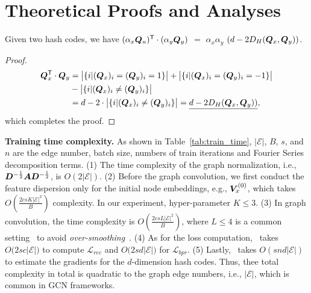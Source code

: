 \section{Theoretical Proofs and Analyses}
\label{sec:discuss}
\addtocounter{thm}{-2}





\begin{thm}
Given two hash codes, we have $(\alpha_x\boldsymbol{Q}_u)^\mathsf{T} \cdot (\alpha_y\boldsymbol{Q}_y)$ $=$ $\alpha_x\alpha_y$ $(d - 2D_{H}(\boldsymbol{Q}_x, \boldsymbol{Q}_y))$.
\end{thm} 

\begin{proof}
\begin{equation}
\begin{aligned}
\setlength\abovedisplayskip{2pt}
\setlength\belowdisplayskip{2pt}
\emb{Q}_x^\mathsf{T} \cdot \emb{Q}_y &= \big|\{ i|(\emb{Q}_{x})_i = (\emb{Q}_{y})_i = 1\}\big| +  \big|\{ i|(\emb{Q}_{x})_i = (\emb{Q}_{y})_i = -1\}\big| \\ 
& -  \big|\{ i|(\emb{Q}_{x})_i \neq (\emb{Q}_{y})_i\}\big|\\
& = d - 2 \cdot \big|\{ i|(\emb{Q}_{x})_i \neq (\emb{Q}_{y})_i\}\big|  = \underline{d - 2D_{H}(\emb{Q}_x, \emb{Q}_y))},\\
\end{aligned}
\end{equation}%
which completes the proof.
\end{proof}


\textbf{Training time complexity.}
As shown in Table~\ref{tab:train_time}, $|\mathcal{E}|$, $B$, $s$, and $n$ are the edge number, batch size, numbers of train iterations and Fourier Series decomposition terms.
(1) The time complexity of the graph normalization, i.e., $\boldsymbol{D}^{-\frac{1}{2}} \boldsymbol{A} \boldsymbol{D}^{-\frac{1}{2}}$, is $O(2|\mathcal{E}|)$.
(2) Before the graph convolution, we first conduct the feature dispersion only for the initial node embeddings, e.g., $\boldsymbol{V}_x^{(0)}$, which takes $O(\frac{2csK|\mathcal{E}|^2}{B})$ complexity.
In our experiment, hyper-parameter $K \leq 3$.
(3) In graph convolution, the time complexity is $O(\frac{2csL|\mathcal{E}|^2}{B})$, where $L \leq 4$ is a common setting~\cite{lightgcn,ngcf,kipf2016semi,graphsage} to avoid \textit{over-smoothing}~\cite{li2019deepgcns}.
(4) As for the loss computation, \model~takes $O\big(2sc|\mathcal{E}|\big)$ to compute $\mathcal{L}_{rec}$ and $O\big(2sd|\mathcal{E}|\big)$ for $\mathcal{L}_{bpr}$.
(5) Lastly, \model~takes $O(snd|\mathcal{E}|)$ to estimate the gradients for the $d$-dimension hash codes.
Thus, thee total complexity in total is quadratic to the graph edge numbers, i.e., $|\mathcal{E}|$, which is common in GCN frameworks.


